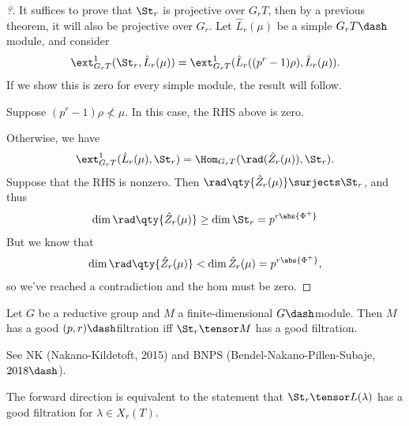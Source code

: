 \begin{proof}[?]

It suffices to prove that \(\St_r\) is projective over \(G_r T\), then
by a previous theorem, it will also be projective over \(G_r\). Let
\(\hat{L}_r(\mu)\) be a simple \(G_rT\dash\)module, and consider
\begin{align*}  
\ext_{G_rT}^1(\St_r, \hat{L}_r(\mu)) =
\ext_{G_rT}^1(\hat{L}_r((p^r-1)\rho), \hat{L}_r(\mu))
.\end{align*} If we show this is zero for every simple module, the
result will follow.

Suppose \((p^r-1)\rho\not< \mu\). In this case, the RHS above is zero.


Otherwise, we have
\begin{align*}  
\ext_{G_rT}^1(\hat{L}_r(\mu), \St_r) =
\Hom_{G_rT}(\rad(\hat{Z}_r(\mu)) , \St_r)
.\end{align*} Suppose that the RHS is nonzero. Then
\(\rad \qty{\hat{Z}_r(\mu)} \surjects \St_r\), and thus
\begin{align*}
\dim \rad\qty{ \hat{Z}_r(\mu) } \geq \dim \St_r = p^{r\abs{\Phi^+}}
\end{align*} But we know that
\begin{align*}
\dim \rad\qty{\hat{Z}_r(\mu)} < \dim \hat{Z}_r(\mu) = p^{r\abs{\Phi^+}}
,\end{align*} so we've reached a contradiction and the hom must be zero.

\end{proof}

\begin{proposition}

Let \(G\) be a reductive group and \(M\) a finite-dimensional
\(G\dash\)module. Then \(M\) has a good \((p, r)\dash\)filtration iff
\(\St_r \tensor M\) has a good filtration.

\end{proposition}

\begin{remark}

See NK (Nakano-Kildetoft, 2015) and BNPS (Bendel-Nakano-Pillen-Subaje,
\(2018\dash\)).

\end{remark}

\begin{remark}

The forward direction is equivalent to the statement that
\(\St_r \tensor L(\lambda)\) has a good filtration for
\(\lambda \in X_r(T)\).

\end{remark}

